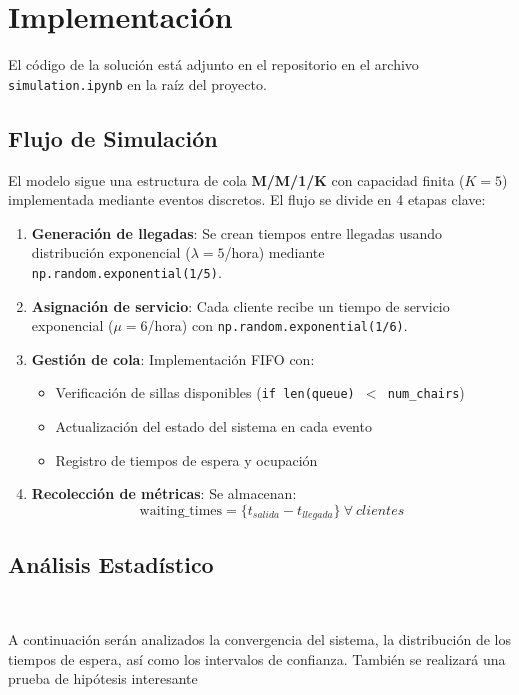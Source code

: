 \documentclass{article}
\begin{document}
\section{Implementación}

El código de la solución está adjunto en el repositorio en el archivo \texttt{simulation.ipynb} en la raíz del proyecto.
\subsection{Flujo de Simulación}
El modelo sigue una estructura de cola \textbf{M/M/1/K} con capacidad finita ($K=5$) implementada mediante eventos discretos. El flujo se divide en 4 etapas clave:

\begin{enumerate}
    \item \textbf{Generación de llegadas}: Se crean tiempos entre llegadas usando distribución exponencial ($\lambda=5$/hora) mediante \texttt{np.random.exponential(1/5)}.
    
    \item \textbf{Asignación de servicio}: Cada cliente recibe un tiempo de servicio exponencial ($\mu=6$/hora) con \texttt{np.random.exponential(1/6)}.
    
    \item \textbf{Gestión de cola}: Implementación FIFO con:
    \begin{itemize}
        \item Verificación de sillas disponibles (\texttt{if len(queue) $<$ num\_chairs})
        \item Actualización del estado del sistema en cada evento
        \item Registro de tiempos de espera y ocupación
    \end{itemize}
    
    \item \textbf{Recolección de métricas}: Se almacenan:
    \begin{equation}
        \text{waiting\_times} = \{t_{salida} - t_{llegada}\}\ \forall\ clientes
    \end{equation}
\end{enumerate}

\subsection{Análisis Estadístico}

\ 

A continuación serán analizados la convergencia del sistema, la distribución de los tiempos de espera, 
así como los intervalos de confianza. También se realizará una prueba de hipótesis interesante
\end{document}
